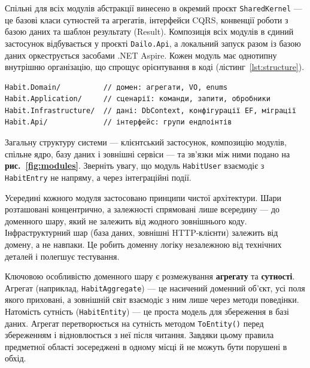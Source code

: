 Спільні для всіх модулів абстракції винесено в окремий проєкт \texttt{SharedKernel} — це базові класи сутностей та агрегатів, інтерфейси CQRS, конвенції роботи з базою даних та шаблон результату (Result). Композиція всіх модулів в єдиний застосунок відбувається у проєкті \texttt{Dailo.Api}, а локальний запуск разом із базою даних оркеструється засобами .NET Aspire. Кожен модуль має однотипну внутрішню організацію, що спрощує орієнтування в коді (лістинг~\ref{lst:structure}).

\begin{lstlisting}[style=nocodeframe, caption={Типова структура модуля}, label={lst:structure}]
Habit.Domain/          // домен: агрегати, VO, enums
Habit.Application/     // сценарії: команди, запити, обробники
Habit.Infrastructure/  // дані: DbContext, конфігурації EF, міграції
Habit.Api/             // інтерфейс: групи ендпоінтів
\end{lstlisting}

Загальну структуру системи — клієнтський застосунок, композицію модулів, спільне ядро, базу даних і зовнішні сервіси — та зв'язки між ними подано на \textbf{рис.~\ref{fig:modules}}. Зверніть увагу, що модуль \texttt{HabitUser} взаємодіє з \texttt{HabitEntry} не напряму, а через інтеграційні події.



Усередині кожного модуля застосовано принципи чистої архітектури. Шари розташовані концентрично, а залежності спрямовані лише всередину — до доменного шару, який не залежить від жодного зовнішнього коду. Інфраструктурний шар (база даних, зовнішні HTTP-клієнти) залежить від домену, а не навпаки. Це робить доменну логіку незалежною від технічних деталей і полегшує тестування.

Ключовою особливістю доменного шару є розмежування \textbf{агрегату} та \textbf{сутності}. Агрегат (наприклад, \texttt{HabitAggregate}) — це насичений доменний об'єкт, усі поля якого приховані, а зовнішній світ взаємодіє з ним лише через методи поведінки. Натомість сутність (\texttt{HabitEntity}) — це проста модель для збереження в базі даних. Агрегат перетворюється на сутність методом \texttt{ToEntity()} перед збереженням і відновлюється з неї після читання. Завдяки цьому правила предметної області зосереджені в одному місці й не можуть бути порушені в обхід.

